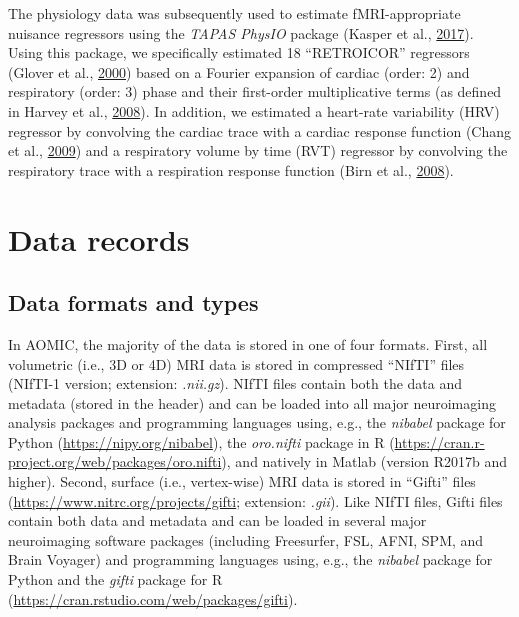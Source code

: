 \documentclass[12pt,american,a4paper,oneside,]{memoir} %
\begin{document}
The physiology data was subsequently used to estimate fMRI-appropriate nuisance regressors using the \emph{TAPAS PhysIO} package (Kasper et al., \protect\hyperlink{ref-Kasper2017-lp}{2017}). Using this package, we specifically estimated 18 ``RETROICOR'' regressors (Glover et al., \protect\hyperlink{ref-Glover2000-or}{2000}) based on a Fourier expansion of cardiac (order: 2) and respiratory (order: 3) phase and their first-order multiplicative terms (as defined in Harvey et al., \protect\hyperlink{ref-Harvey2008-nt}{2008}). In addition, we estimated a heart-rate variability (HRV) regressor by convolving the cardiac trace with a cardiac response function (Chang et al., \protect\hyperlink{ref-Chang2009-vu}{2009}) and a respiratory volume by time (RVT) regressor by convolving the respiratory trace with a respiration response function (Birn et al., \protect\hyperlink{ref-Birn2008-ti}{2008}).

\hypertarget{data-records}{%
\section{Data records}\label{data-records}}

\hypertarget{data-formats-and-types}{%
\subsection{Data formats and types}\label{data-formats-and-types}}

In AOMIC, the majority of the data is stored in one of four formats. First, all volumetric (i.e., 3D or 4D) MRI data is stored in compressed ``NIfTI'' files (NIfTI-1 version; extension: \emph{.nii.gz}). NIfTI files contain both the data and metadata (stored in the header) and can be loaded into all major neuroimaging analysis packages and programming languages using, e.g., the \emph{nibabel} package for Python (\url{https://nipy.org/nibabel}), the \emph{oro.nifti} package in R (\url{https://cran.r-project.org/web/packages/oro.nifti}), and natively in Matlab (version R2017b and higher). Second, surface (i.e., vertex-wise) MRI data is stored in ``Gifti'' files (\url{https://www.nitrc.org/projects/gifti}; extension: \emph{.gii}). Like NIfTI files, Gifti files contain both data and metadata and can be loaded in several major neuroimaging software packages (including Freesurfer, FSL, AFNI, SPM, and Brain Voyager) and programming languages using, e.g., the \emph{nibabel} package for Python and the \emph{gifti} package for R (\url{https://cran.rstudio.com/web/packages/gifti}).
\end{document}
